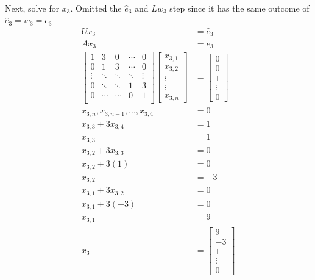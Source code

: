 \documentclass[a4paper]{article}
\begin{document}
\paragraph{}
Next, solve for $x_3$. Omitted the $\hat{e}_3$ and $Lw_3$ step since it has the same outcome of $\hat{e}_3 = w_3 = e_3$
\begin{equation*}
\begin{split}
Ux_3 &= \hat{e}_3\\
Ax_3 &= e_3 \\
\begin{bmatrix}
   1 & 3 & 0 & \cdots & 0 \\
   0 & 1 & 3 & \cdots & 0 \\ 
   \vdots & \ddots & \ddots & \ddots & \vdots\\
   0 & \ddots &\ddots & 1 & 3 \\
   0 & \cdots &\cdots & 0 & 1\\
\end{bmatrix}
\begin{bmatrix}
   x_{3,1} \\ x_{3,2} \\ \vdots\\ \vdots\\ x_{3,n}
\end{bmatrix}
&= \begin{bmatrix}
   0 \\ 0 \\ 1\\ \vdots\\ 0
\end{bmatrix}\\
x_{3,n}, x_{3,n-1}, ... ,x_{3,4}&=0\\
x_{3,3} + 3x_{3,4} &=1\\
x_{3,3} &= 1\\
x_{3,2} + 3x_{3,3} &=0\\
x_{3,2} + 3(1) &=0 \\
x_{3,2} &= -3\\
x_{3,1} + 3x_{3,2} &=0\\
x_{3,1} + 3(-3) &=0 \\
x_{3,1} &= 9\\
    x_3 &= \begin{bmatrix}
   9 \\ -3 \\ 1 \\ \vdots\\ 0
        \end{bmatrix}\\
\end{split}
\end{equation*}
\end{document}
